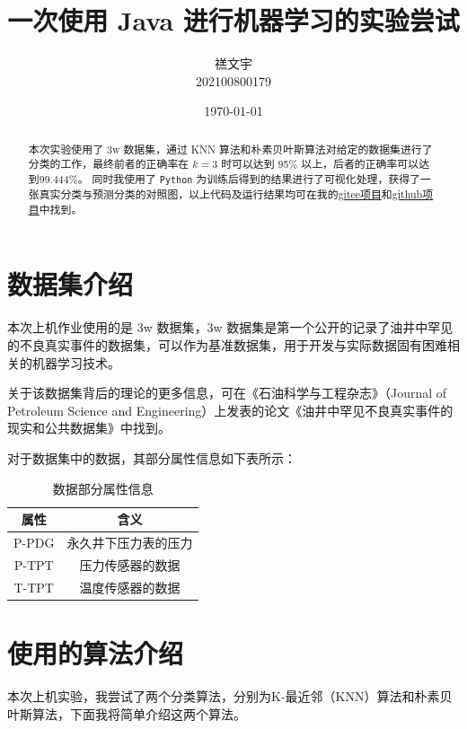 \documentclass[a4paper, 11pt, cn]{elegantpaper}
\title{一次使用 Java 进行机器学习的实验尝试}
\author{禚文宇 \\ 202100800179}
\date{\today}
\begin{document}
\maketitle

\begin{abstract}
    本次实验使用了 3w 数据集，通过 KNN 算法和朴素贝叶斯算法对给定的数据集进行了分类的工作，最终前者的正确率在 $k=3$ 时可以达到 95$\%$ 以上，后者的正确率可以达到99.444$\%$。
    同时我使用了 \texttt{Python} 为训练后得到的结果进行了可视化处理，获得了一张真实分类与预测分类的对照图，以上代码及运行结果均可在我的\href{https://gitee.com/Dusker_233/sduw_-java_-ml_2022}{gitee项目}和\href{https://github.com/Dusker233/sduw_java_mltest}{github项目}中找到。
\end{abstract}

\tableofcontents
\newpage

\section{数据集介绍}
本次上机作业使用的是 3w 数据集，3w 数据集是第一个公开的记录了油井中罕见的不良真实事件的数据集，可以作为基准数据集，用于开发与实际数据固有困难相关的机器学习技术。

关于该数据集背后的理论的更多信息，可在《石油科学与工程杂志》（Journal of Petroleum Science and Engineering）上发表的论文《油井中罕见不良真实事件的现实和公共数据集》\cite{3w}中找到。

对于数据集中的数据，其部分属性信息如下表所示：

\begin{table}[htbp]\centering
    \begin{tabular}{c|c}
    \hline
    属性    & 含义         \\ \hline
    P-PDG & 永久井下压力表的压力 \\ \hline
    P-TPT & 压力传感器的数据   \\ \hline
    T-TPT & 温度传感器的数据   \\ \hline
    \end{tabular}
    \caption{数据部分属性信息}
\end{table}

\section{使用的算法介绍}

本次上机实验，我尝试了两个分类算法，分别为K-最近邻（KNN）算法和朴素贝叶斯算法，下面我将简单介绍这两个算法。
\end{document}
